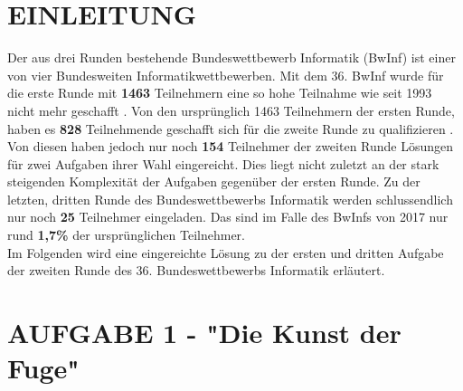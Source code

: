 \documentclass[a4paper,12pt]{article}
\begin{document}
\thispagestyle{empty}
\tableofcontents	
\thispagestyle{empty}




\newpage
\setcounter{page}{4}
\section{EINLEITUNG}



Der aus drei Runden bestehende Bundeswettbewerb Informatik (BwInf) ist einer von vier Bundesweiten Informatikwettbewerben. Mit dem 36. BwInf wurde für die erste Runde mit \textbf{1463} Teilnehmern eine so hohe Teilnahme wie seit 1993 nicht mehr geschafft \cite{bwinf_runde1_ergebnis}. Von den ursprünglich 1463 Teilnehmern der ersten Runde, haben es \textbf{828} Teilnehmende geschafft sich für die zweite Runde zu qualifizieren \cite{bwinf_runde2_ergebnis}. Von diesen haben jedoch nur noch \textbf{154} Teilnehmer der zweiten Runde Lösungen für zwei Aufgaben ihrer Wahl eingereicht. Dies liegt nicht zuletzt an der stark steigenden Komplexität der Aufgaben gegenüber der ersten Runde. Zu der letzten, dritten Runde des Bundeswettbewerbs Informatik werden schlussendlich nur noch \textbf{25} Teilnehmer eingeladen. Das sind im Falle des BwInfs von 2017 nur rund \textbf{1,7\%} der ursprünglichen Teilnehmer.
\\[0.4cm]
Im Folgenden wird eine eingereichte Lösung zu der ersten und dritten Aufgabe der zweiten Runde des 36. Bundeswettbewerbs Informatik erläutert.


\newpage
\section{AUFGABE 1 - "Die Kunst der Fuge"}
\end{document}

